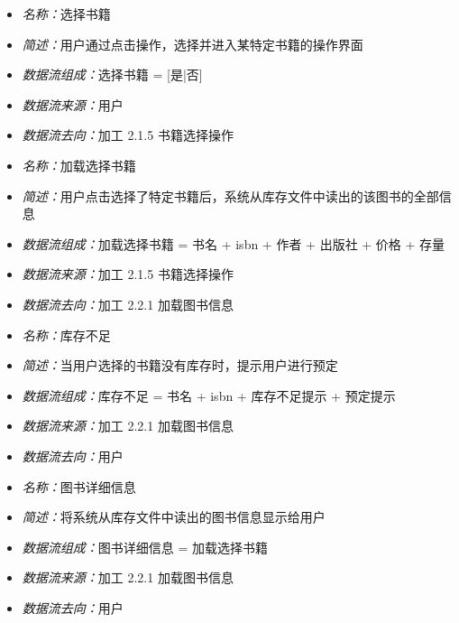 \vspace{-1mm}

\begin{itemize}
	\item \textit{名称：}选择书籍
	\item \textit{简述：}用户通过点击操作，选择并进入某特定书籍的操作界面
	\item \textit{数据流组成：}选择书籍 = [是|否]
	\item \textit{数据流来源：}用户
	\item \textit{数据流去向：}加工 2.1.5 书籍选择操作
\end{itemize}

\vspace{-1mm}

\begin{itemize}
	\item \textit{名称：}加载选择书籍
	\item \textit{简述：}用户点击选择了特定书籍后，系统从库存文件中读出的该图书的全部信息
	\item \textit{数据流组成：}加载选择书籍 = 书名 + isbn + 作者 + 出版社 + 价格 + 存量
	\item \textit{数据流来源：}加工 2.1.5 书籍选择操作
	\item \textit{数据流去向：}加工 2.2.1 加载图书信息
\end{itemize}

\vspace{-1mm}

\begin{itemize}
	\item \textit{名称：}库存不足
	\item \textit{简述：}当用户选择的书籍没有库存时，提示用户进行预定
	\item \textit{数据流组成：}库存不足 = 书名 + isbn + 库存不足提示 + 预定提示
	\item \textit{数据流来源：}加工 2.2.1 加载图书信息
	\item \textit{数据流去向：}用户
\end{itemize}

\vspace{-1mm}

\begin{itemize}
	\item \textit{名称：}图书详细信息
	\item \textit{简述：}将系统从库存文件中读出的图书信息显示给用户
	\item \textit{数据流组成：}图书详细信息 = 加载选择书籍
	\item \textit{数据流来源：}加工 2.2.1 加载图书信息
	\item \textit{数据流去向：}用户
\end{itemize}

